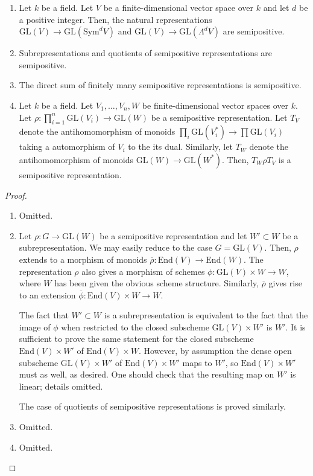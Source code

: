 \begin{lemma}\label{semipos_rep_examples}
\begin{enumerate}
\item\label{sym_and_wedge_semipos} Let $k$ be a field.
Let $V$ be a finite-dimensional vector space over $k$ and let $d$ be a positive
integer.
Then, the natural representations
$\mathrm{GL}(V)\to \mathrm{GL}(\mathrm{Sym}^dV)$ and
$\mathrm{GL}(V)\to \mathrm{GL}(\Lambda^dV)$
are semipositive.
\item\label{subreps_and_quotients_semipos} Subrepresentations and quotients of
  semipositive representations are semipositive.
\item The direct sum of finitely many semipositive representations is
  semipositive.
\item
Let $k$ be a field.
Let $V_1,\ldots,V_n,W$ be finite-dimensional vector spaces over $k$.
Let $\rho:\prod_{i=1}^{n}\mathrm{GL}(V_i)\rightarrow \mathrm{GL}(W)$ be a
semipositive representation.
Let $T_V$ denote the antihomomorphism of monoids
$\prod_i\mathrm{GL}(V_i^*)\to\prod\mathrm{GL}(V_i)$ taking a automorphism of
$V_i$ to the its dual.
Similarly, let $T_W$ denote the antihomomorphism of monoids
$\mathrm{GL}(W)\to\mathrm{GL}(W^*)$.
Then, $T_W\rho T_V$ is a semipositive representation.
\end{enumerate}
\end{lemma}

\begin{proof}
\begin{enumerate}
\item Omitted.
\item Let $\rho:G\to \mathrm{GL}(W)$ be a semipositive representation and let
$W'\subset W$ be a subrepresentation.
We may easily reduce to the case $G=\mathrm{GL}(V)$.
Then, $\rho$ extends to a morphism of monoids
$\overline{\rho}:\mathrm{End}(V)\to \mathrm{End}(W)$.
The representation $\rho$ also gives a morphism of schemes
$\phi:\mathrm{GL}(V)\times W\to W$, where $W$ has been given the obvious scheme
structure.
Similarly, $\overline{\rho}$ gives rise to an extension
$\overline{\phi}:\mathrm{End}(V)\times W\to W$.

The fact that $W'\subset W$ is a subrepresentation is equivalent to the fact
that the image of $\phi$ when restricted to the closed subscheme
$\mathrm{GL}(V)\times W'$ is $W'$.
It is sufficient to prove the same statement for the closed subscheme
$\mathrm{End}(V)\times W'$ of $\mathrm{End}(V)\times W$.
However, by assumption the dense open subscheme $\mathrm{GL}(V)\times W'$ of
$\mathrm{End}(V)\times W'$ maps to $W'$, so $\mathrm{End}(V)\times W'$ must as
well, as desired. One should check that the resulting map on $W'$ is linear;
details omitted.

The case of quotients of semipositive representations is proved similarly.
\item Omitted.
\item Omitted.
\end{enumerate}
\end{proof}


